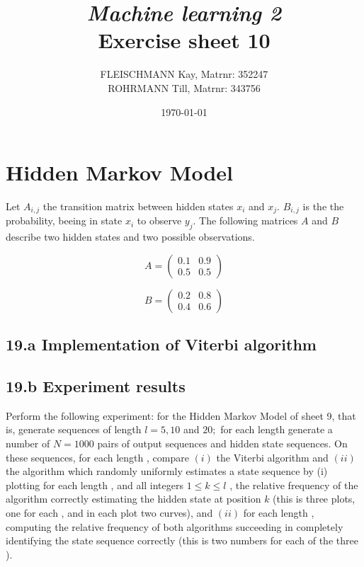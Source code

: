 \documentclass[a4paper, 12pt, titlepage]{article}
\title
{{\em Machine learning 2}\\
Exercise sheet 10}
\author{FLEISCHMANN Kay, Matrnr: 352247\\
	ROHRMANN Till, Matrnr: 343756}
\date{\today}
\begin{document}
\maketitle
\section*{Hidden Markov Model}

Let $A_{i,j}$ the transition matrix between hidden states $x_i$ and $x_j$. $B_{i,j}$ is the the probability, beeing in state $x_i$ to observe $y_j$.
The following matrices $A$ and $B$ describe two hidden states and two possible observations.

\[
A= 
 \begin{pmatrix}
  0.1 & 0.9 \\
  0.5 & 0.5
 \end{pmatrix}
\]

\[
B=
 \begin{pmatrix}
  0.2 & 0.8 \\
  0.4 & 0.6
 \end{pmatrix}
\]

\subsection*{19.a Implementation of Viterbi algorithm}
\subsection*{19.b Experiment results}

Perform the following experiment: for the Hidden Markov Model of sheet 9, that is, generate sequences of length $l= 5, 10$ and $20;$ for each length generate a number of $N = 1000$ pairs of output sequences and hidden state sequences. On these sequences, for each length , compare $(i)$ the Viterbi algorithm and $(ii)$ the algorithm which randomly uniformly estimates a state sequence by (i) plotting for each length , and all integers $1 \le k \le l$ , the relative frequency of the algorithm correctly estimating the hidden state at position $k$ (this is three plots, one for each , and in each plot two curves), and $(ii)$ for each length , computing the relative frequency of both algorithms succeeding in completely identifying the state sequence correctly (this is two numbers for each of the three ).
\end{document}
